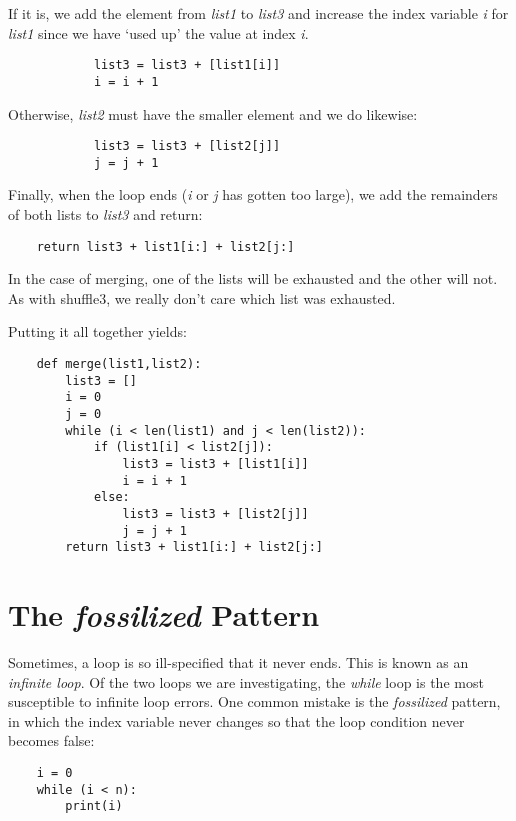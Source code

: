 If it is, we add the element from {\it list1} to {\it list3} and increase
the index variable {\it i} for {\it list1} since we have `used up' the value
at index {\it i}.

\begin{verbatim}
            list3 = list3 + [list1[i]]
            i = i + 1
\end{verbatim}

Otherwise, {\it list2} must have the smaller element and we do likewise:

\begin{verbatim}
            list3 = list3 + [list2[j]]
            j = j + 1
\end{verbatim}

Finally, when the loop ends ({\it i} or {\it j} has gotten too large),
we add the remainders of both lists to {\it list3} and return:

\begin{verbatim}
    return list3 + list1[i:] + list2[j:]
\end{verbatim}

In the case of merging, one of the lists will be exhausted
and the other will not. As with shuffle3, we really don't
care which list was exhausted.

Putting it all together yields:

\begin{verbatim}
    def merge(list1,list2):
        list3 = []
        i = 0
        j = 0
        while (i < len(list1) and j < len(list2)):
            if (list1[i] < list2[j]):
                list3 = list3 + [list1[i]]
                i = i + 1
            else:
                list3 = list3 + [list2[j]]
                j = j + 1
        return list3 + list1[i:] + list2[j:]
\end{verbatim}

\section{The {\it fossilized} Pattern}

Sometimes, a loop is so ill-specified that it never ends. This
is known as an {\it infinite loop}. Of the
two loops we are investigating, the {\it while} loop is the most
susceptible to infinite loop errors. One common mistake
is the {\it fossilized} pattern, in which the index variable never
changes so that the loop condition never becomes false:

\begin{verbatim}
    i = 0
    while (i < n):
        print(i)
\end{verbatim}

